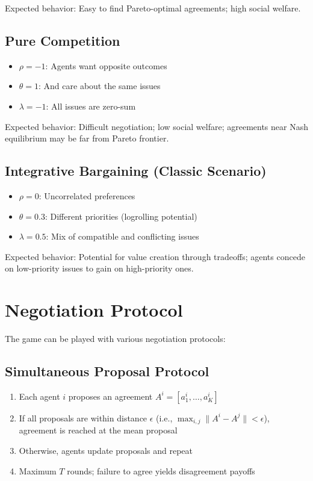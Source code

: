 \documentclass[11pt]{article}
\begin{document}
Expected behavior: Easy to find Pareto-optimal agreements; high social welfare.

\subsection{Pure Competition}
\begin{itemize}
    \item $\rho = -1$: Agents want opposite outcomes
    \item $\theta = 1$: And care about the same issues
    \item $\lambda = -1$: All issues are zero-sum
\end{itemize}

Expected behavior: Difficult negotiation; low social welfare; agreements near Nash equilibrium may be far from Pareto frontier.

\subsection{Integrative Bargaining (Classic Scenario)}
\begin{itemize}
    \item $\rho = 0$: Uncorrelated preferences
    \item $\theta = 0.3$: Different priorities (logrolling potential)
    \item $\lambda = 0.5$: Mix of compatible and conflicting issues
\end{itemize}

Expected behavior: Potential for value creation through tradeoffs; agents concede on low-priority issues to gain on high-priority ones.

\section{Negotiation Protocol}

The game can be played with various negotiation protocols:

\subsection{Simultaneous Proposal Protocol}
\begin{enumerate}
    \item Each agent $i$ proposes an agreement $A^i = [a^i_1, \ldots, a^i_K]$
    \item If all proposals are within distance $\epsilon$ (i.e., $\max_{i,j} \|A^i - A^j\| < \epsilon$), agreement is reached at the mean proposal
    \item Otherwise, agents update proposals and repeat
    \item Maximum $T$ rounds; failure to agree yields disagreement payoffs
\end{enumerate}
\end{document}
